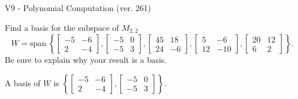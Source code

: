 \begin{exercise}
  \begin{exerciseTitle}V9 - Polynomial Computation (ver. 261)\end{exerciseTitle}
  \begin{exerciseStatement}
    Find a basis for the subspace of \(M_{2,2}\) 
\[W=\mathrm{span}\ \left\{\left[\begin{array}{cc}
-5 & -6 \\
2 & -4
\end{array}\right] , \left[\begin{array}{cc}
-5 & 0 \\
-5 & 3
\end{array}\right] , \left[\begin{array}{cc}
45 & 18 \\
24 & -6
\end{array}\right] , \left[\begin{array}{cc}
5 & -6 \\
12 & -10
\end{array}\right] , \left[\begin{array}{cc}
20 & 12 \\
6 & 2
\end{array}\right]\right\}.\]
 Be sure to explain why your result is a basis.


  \end{exerciseStatement}
  \begin{exerciseAnswer}
   A basis of \(W\) is  \(\left\{\left[\begin{array}{cc}
-5 & -6 \\
2 & -4
\end{array}\right] , \left[\begin{array}{cc}
-5 & 0 \\
-5 & 3
\end{array}\right]\right\}\).
  


  \end{exerciseAnswer}
\end{exercise}